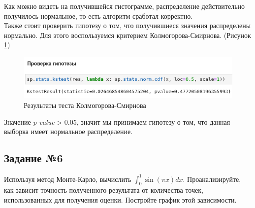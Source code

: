 \documentclass[14pt,fleqn]{extarticle}
\begin{document}
	Как можно видеть на получившейся гистограмме, распределение действительно получилось нормальное, то есть алгоритм сработал корректно.\\
	
   	Также стоит проверить гипотезу о том, что получившиеся значения распределены нормально. Для этого воспользуемся критерием Колмогорова-Смирнова. (Рисунок \ref{fig:central_limit_theorem_test})
	\begin{figure}[h]
		\centering \includegraphics[scale=0.6]{central_limit_theorem_test}
		\caption{Результаты теста Колмогорова-Смирнова}
		\label{fig:central_limit_theorem_test}
	\end{figure}

	Значение \textit{p-value} > 0.05, значит мы принимаем гипотезу о том, что данная выборка имеет нормальное распределение.
	
	\newpage
	
	\subsection*{Задание №6}
	Используя метод Монте-Карло, вычислить $\int_{0}^{1} \sin(\pi x) dx$. Проанализируйте, как зависит точность полученного результата от количества точек, использованных для получения оценки. Постройте график этой зависимости.
	\newline
	
\end{document}
